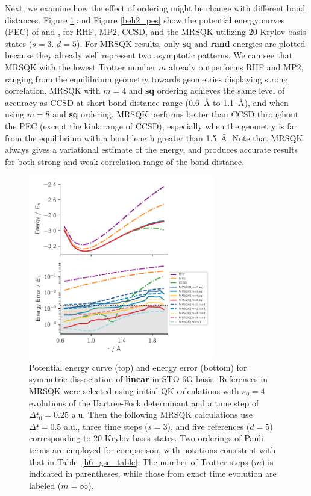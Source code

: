 \documentclass[journal=jctcce,manuscript=article]{achemso}
\newcommand{\methodabbr}[0]{MRSQK\xspace}
\begin{document}
Next, we examine how the effect of ordering might be change with different bond distances. Figure \ref{h6_pes} and Figure \ref{beh2_pes} show the potential energy curves (PEC) of  and , for RHF, MP2, CCSD, and the \methodabbr utilizing 20 Krylov basis states ($s=3$. $d=5$).
For \methodabbr results, only \textbf{sq} and \textbf{rand} energies are plotted because they already well represent two asymptotic patterns.
We can see that \methodabbr with the lowest Trotter number $m$ already outperforms RHF and MP2, ranging from the equilibrium geometry towards geometries displaying strong correlation. 
\methodabbr with $m=4$ and \textbf{sq} ordering achieves the same level of accuracy as CCSD at short bond distance range (0.6~\AA{} to 1.1~\AA), and when using $m=8$ and \textbf{sq} ordering, \methodabbr performs better than CCSD throughout the PEC (except the kink range of CCSD), especially when the geometry is far from the equilibrium with a bond length greater than 1.5~\AA. Note that \methodabbr always gives a variational estimate of the energy, and produces accurate results for both strong and weak correlation range of the bond distance.

\begin{figure}[h!]
  \centering
  \includegraphics[width=3.2in]{figs/H6_pes_error.pdf}
  \caption{Potential energy curve (top) and energy error (bottom) for symmetric dissociation of \textbf{linear } in STO-6G basis.
  References in \methodabbr were selected using initial QK calculations with $s_0 = 4$ evolutions of the Hartree-Fock determinant and a time step of $ \Delta t_0 = 0.25$ a.u.
  Then the following \methodabbr calculations use $ \Delta t = 0.5$ a.u., three time steps ($s=3$), and five references ($d=5$) corresponding to 20 Krylov basis states. 
  Two orderings of Pauli terms are employed for comparison, with notations consistent with that in Table~\ref{h6_gse_table}.
  The number of Trotter steps ($m$) is indicated in parentheses, while those from exact time evolution are labeled ($m = \infty$).
   }
\label{h6_pes}
\end{figure}
\end{document}
